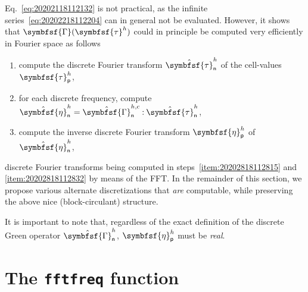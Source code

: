 \documentclass[draft, appendixprefix=true, chapterprefix=true, fontsize=12pt, numbers=noendperiod]{scrbook}
\newcommand{\dbldot}{\mathbin{\mathord{:}}}
\newcommand{\tens}[1]{\symbfsf{#1}}
\newcommand{\tuple}[1]{\mathsf{#1}}
\begin{document}
Eq.~\eqref{eq:20202118112132} is not practical, as the infinite
series~\eqref{eq:20202218112204} can in general not be evaluated. However, it
shows that \(\tens\Gamma(\tens\tau^h)\) could in principle be computed very
efficiently in Fourier space as follows
\begin{enumerate}
\item\label{item:20202818112815} compute the discrete Fourier transform
  \(\hat{\tens\tau}_{\tuple{n}}^h\) of the cell-values \(\tens\tau_{\tuple{p}}^h\),
\item for each discrete frequency, compute
  \(\hat{\tens\eta}_{\tuple{n}}^h=\hat{\tens\Gamma}_{\tuple{n}}^{h,\mathrm{c}}\dbldot\hat{\tens\tau}_{\tuple{n}}^h\),
\item\label{item:20202818112832} compute the inverse discrete Fourier transform
  \(\tens\eta_{\tuple{p}}^h\) of \(\hat{\tens\eta}_{\tuple{n}}^h\),
\end{enumerate}
discrete Fourier transforms being computed in steps~\ref{item:20202818112815}
and \ref{item:20202818112832} by means of the FFT. In the remainder of this
section, we propose various alternate discretizations that \emph{are}
computable, while preserving the above nice (block-circulant) structure.

It is important to note that, regardless of the exact definition of the discrete Green operator \(\hat{\tens\Gamma}_{\tuple{n}}^h\),  \(\tens\eta_{\tuple{p}}^h\) must be \emph{real}.

\section{The \texttt{fftfreq} function}
\end{document}
